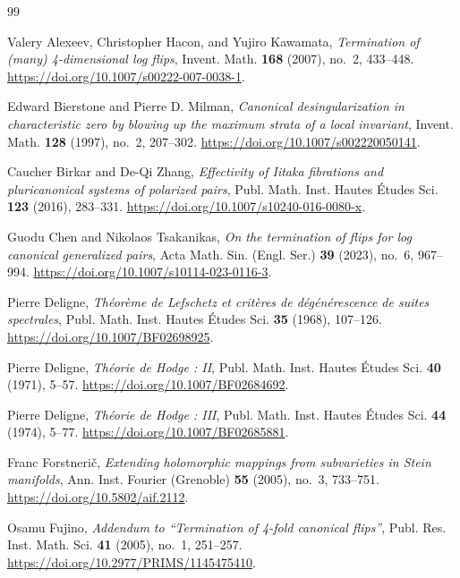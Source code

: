\begin{thebibliography}{99}
\raggedright

Valery Alexeev, Christopher Hacon, and Yujiro Kawamata,
\emph{Termination of (many) 4-dimensional log flips},
Invent. Math. \textbf{168} (2007), no.~2, 433--448.
\url{https://doi.org/10.1007/s00222-007-0038-1}.

Edward Bierstone and Pierre D. Milman,
\emph{Canonical desingularization in characteristic zero by blowing up the
maximum strata of a local invariant},
Invent. Math. \textbf{128} (1997), no.~2, 207--302.
\url{https://doi.org/10.1007/s002220050141}.

Caucher Birkar and De-Qi Zhang,
\emph{Effectivity of Iitaka fibrations and pluricanonical systems of polarized pairs},
Publ. Math. Inst. Hautes \'{E}tudes Sci. \textbf{123} (2016), 283--331.
\url{https://doi.org/10.1007/s10240-016-0080-x}.

Guodu Chen and Nikolaos Tsakanikas,
\emph{On the termination of flips for log canonical generalized pairs},
Acta Math. Sin. (Engl. Ser.) \textbf{39} (2023), no.~6, 967--994.
\url{https://doi.org/10.1007/s10114-023-0116-3}.

Pierre Deligne,
\emph{Th\'eor\`eme de Lefschetz et crit\`eres de d\'eg\'en\'erescence de suites spectrales},
Publ. Math. Inst. Hautes \'{E}tudes Sci. \textbf{35} (1968), 107--126.
\url{https://doi.org/10.1007/BF02698925}.

Pierre Deligne,
\emph{Th\'eorie de Hodge : II},
Publ. Math. Inst. Hautes \'{E}tudes Sci. \textbf{40} (1971), 5--57.
\url{https://doi.org/10.1007/BF02684692}.

Pierre Deligne,
\emph{Th\'eorie de Hodge : III},
Publ. Math. Inst. Hautes \'{E}tudes Sci. \textbf{44} (1974), 5--77.
\url{https://doi.org/10.1007/BF02685881}.

Franc Forstneri\v{c},
\emph{Extending holomorphic mappings from subvarieties in Stein manifolds},
Ann. Inst. Fourier (Grenoble) \textbf{55} (2005), no.~3, 733--751.
\url{https://doi.org/10.5802/aif.2112}.

Osamu Fujino,
\emph{Addendum to \textquotedblleft Termination of 4-fold canonical flips\textquotedblright},
Publ. Res. Inst. Math. Sci. \textbf{41} (2005), no.~1, 251--257.
\url{https://doi.org/10.2977/PRIMS/1145475410}.


\end{thebibliography}
